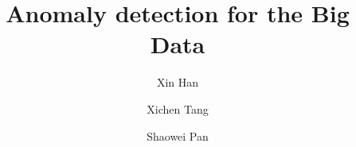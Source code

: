 \documentclass{amsart}
\begin{document}
%
%
\title[A Short Running Title]{Anomaly detection for the Big Data}%
\author{Xin Han}
\address[A.~1]{School of Computer Science\\
Xi'an Shiyou University, Shaanxi 710065, China}%

\author{Xichen Tang}
\address[A.~2]{School of Information and Control Engineering \\
Qingdao University of Technology, Qingdao 266033, China}%


\author{Shaowei Pan}
\address[A.~3]{School of Computer Science \\
Xi'an Shiyou University, Shaanxi 710065, China}%

%
%
\date{\gitAuthorDate}%


\maketitle







\end{document}
